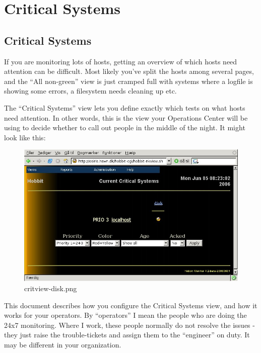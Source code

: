 \chapter{Critical Systems}

\section{Critical Systems}


 If you are monitoring lots of hosts, getting an overview of which
 hosts need attention can be difficult. Most likely you've split the
 hosts among several pages, and the ``All non-green'' view is just
 cramped full with systems where a logfile is showing some errors, a
 filesystem needs cleaning up etc.



 The ``Critical Systems'' view lets you define exactly which tests on
 what hosts need attention. In other words, this is the view your
 Operations Center will be using to decide whether to call out people
 in the middle of the night. It might look like this:

\begin{figure} 
\centering 
\caption{critview-disk.png} 
\label{critview-disk.png} 
 \includegraphics[scale=0.6]{./critview-disk.png} 
\end{figure}


 This document describes how you configure the Critical Systems view,
 and how it works for your operators. By ``operators'' I mean the
 people who are doing the 24x7 monitoring. Where I work, these people
 normally do not resolve the issues - they just raise the
 trouble-tickets and assign them to the ``engineer'' on duty. It may
 be different in your organization.

